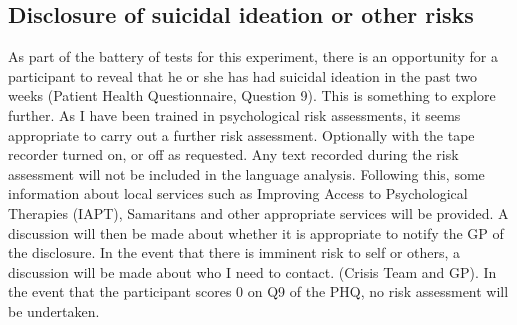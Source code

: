 \documentclass[10pt, letterpaper, twoside, openany]{book}
\begin{document}
\subsection{Disclosure of suicidal ideation or other risks}
As part of the battery of tests for this experiment, there is an opportunity for a participant to reveal that he or she has had suicidal ideation in the past two weeks (Patient Health Questionnaire, Question 9). This is something to explore further. As I have been trained in psychological risk assessments, it seems appropriate to carry out a further risk assessment.  Optionally with the tape recorder turned on, or off as requested.  Any text recorded during the risk assessment will not be included in the language analysis. Following this, some information about local services such as Improving Access to Psychological Therapies (IAPT), Samaritans and other appropriate services will be provided. A discussion will then be made about whether it is appropriate to notify the GP of the disclosure. In the event that there is imminent risk to self or others, a discussion will be made about who I need to contact. (Crisis Team and GP). In the event that the participant scores 0 on Q9 of the PHQ, no risk assessment will be undertaken.
\end{document}
